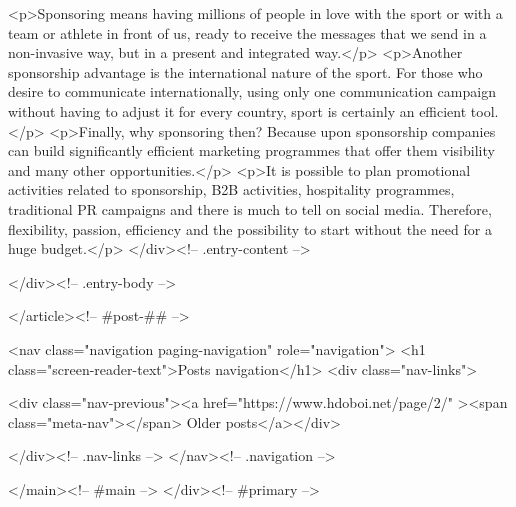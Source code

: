 <p>Sponsoring means having millions of people in love with the sport or with a team or athlete in front of us, ready to receive the messages that we send in a non-invasive way, but in a present and integrated way.</p>
<p>Another sponsorship advantage is the international nature of the sport. For those who desire to communicate internationally, using only one communication campaign without having to adjust it for every country, sport is certainly an efficient tool.</p>
<p>Finally, why sponsoring then? Because upon sponsorship companies can build significantly efficient marketing programmes that offer them visibility and many other opportunities.</p>
<p>It is possible to plan promotional activities related to sponsorship, B2B activities, hospitality programmes, traditional PR campaigns and there is much to tell on social media. Therefore, flexibility, passion, efficiency and the possibility to start without the need for a huge budget.</p>
					</div><!-- .entry-content -->
		
		
			</div><!-- .entry-body -->

</article><!-- #post-## -->

			
				<nav class="navigation paging-navigation" role="navigation">
		<h1 class="screen-reader-text">Posts navigation</h1>
		<div class="nav-links">

						<div class="nav-previous"><a href="https://www.hdoboi.net/page/2/" ><span class="meta-nav"></span> Older posts</a></div>
			
			
		</div><!-- .nav-links -->
	</nav><!-- .navigation -->
	
		
		</main><!-- #main -->
	</div><!-- #primary -->

